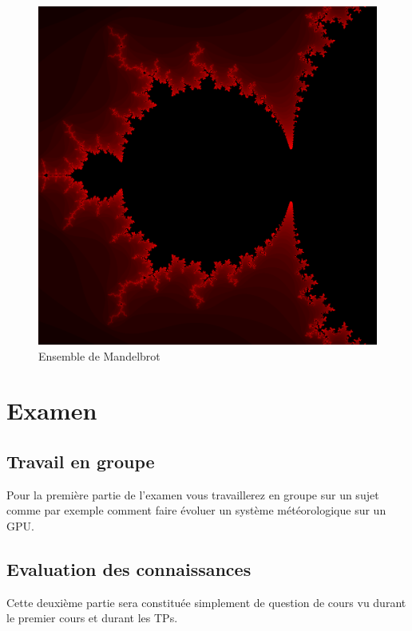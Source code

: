 \documentclass[french,12pt]{article}
\begin{document}
\begin{figure}[H]
	\centering
	\includegraphics[scale=0.1]{figures/Mandelbrot.png}
	\caption{Ensemble de Mandelbrot}
\end{figure}

\section{Examen}
\subsection{Travail en groupe}
Pour la première partie de l'examen vous travaillerez en groupe sur un sujet comme par exemple comment faire évoluer un système météorologique sur un GPU.
\subsection{Evaluation des connaissances}
Cette deuxième partie sera constituée simplement de question de cours vu durant le premier cours et durant les TPs.
\end{document}
